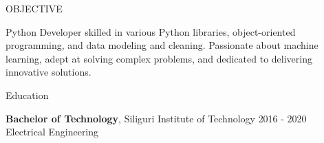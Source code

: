 \documentclass{resume} %
\begin{document}

\begin{rSection}{OBJECTIVE}

{Python Developer skilled in various Python libraries, object-oriented programming, and data modeling and cleaning. Passionate about machine learning, adept at solving complex problems, and dedicated to delivering innovative solutions.}


\end{rSection}

\begin{rSection}{Education}

{\bf Bachelor of Technology}, Siliguri Institute of Technology  \hfill {2016 - 2020}\\
Electrical Engineering


\end{rSection}
\end{document}
